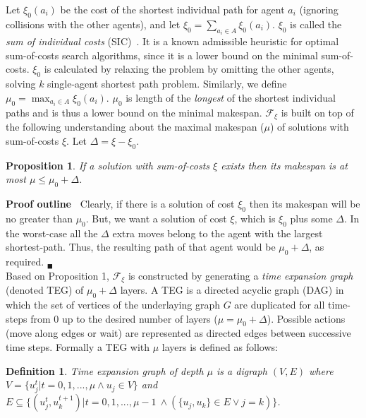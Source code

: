\documentclass[letterpaper]{article}
\newtheorem{definition}{Definition}
\begin{document}
Let $\xi_0(a_i)$ be the cost of the shortest individual path for agent $a_i$
(ignoring collisions with the other agents), and let $\xi_0=\sum_{a_i\in A}
\xi_0(a_i)$. $\xi_0$ is called the {\em sum of individual costs}
(SIC)~\cite{DBLP:journals/ai/SharonSGF13}. It is a known admissible heuristic
for optimal sum-of-costs search algorithms, since it is a lower bound on the
minimal sum-of-costs. $\xi_0$ is calculated by relaxing the problem by omitting
the other agents, solving $k$ single-agent shortest path problem.  Similarly,
we define $\mu_0=\max_{a_i\in A} \xi_0(a_i)$.  $\mu_0$ is length of the {\em
longest} of the shortest individual paths and is thus a lower bound on the
minimal makespan. $\mathcal{F}_\xi$ is built on top of the following
understanding about the maximal makespan ($\mu$) of solutions with sum-of-costs
$\xi$. Let $\Delta=\xi-\xi_0$.
\newtheorem{proposition}{Proposition}

\begin{proposition}\label{prop:upperbound}
    If a solution with sum-of-costs $\xi$ exists then its makespan is at most $\mu \leq \mu_0 + \Delta$.
\end{proposition}

{\bf Proof outline~\cite{SurynekFSB16}} Clearly, if there is a solution of cost
$\xi_0$ then its makespan will be no greater than $\mu_0$. But, we want a
solution of cost $\xi$, which is $\xi_0$ plus some $\Delta$. In the worst-case
all the $\Delta$ extra moves belong to the agent with the largest
shortest-path. Thus, the resulting path
of that agent would be $\mu_0+\Delta$, as required. $_\blacksquare$\\


Based on Proposition 1, $\mathcal{F}_\xi$ is constructed by generating a {\em
time expansion graph}~\cite{SurynekFSB16} (denoted TEG) of
$\mu_0+\Delta$ layers. A TEG is a directed acyclic graph (DAG) in which the set
of vertices of the underlaying graph $G$ are duplicated for all time-steps from
0 up to the desired number of layers ($\mu=\mu_0+\Delta$). Possible actions
(move along edges or wait) are represented as directed edges between successive
time steps. Formally a TEG with $\mu$ layers is defined as follows:

\begin{definition}
    \textit{Time expansion graph}  of depth $\mu$ is a digraph $(V,E)$ where
    $V=\{u^t_j|t=0,1,...,\mu \wedge u_j \in V\}$ and $E \subseteq \{
    {(u_j^t,u_k^{t+1})} | t=0,1,...,\mu-1\ \wedge (\{u_j,u_k\} \in E \vee j=k) \}$.
    \label{def:modifiedExpansionGraph}
\end{definition}
\end{document}
